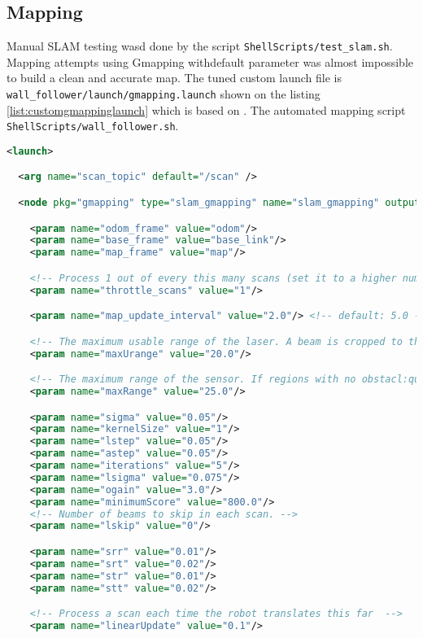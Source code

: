 \documentclass[10pt,journal,compsoc]{IEEEtran}
\begin{document}
\subsection{Mapping}
Manual SLAM testing wasd done by the script \verb!ShellScripts/test_slam.sh!.
Mapping attempts using Gmapping withdefault parameter was almost impossible to build a clean and accurate map. The tuned custom launch file is \verb!wall_follower/launch/gmapping.launch! shown on the listing \ref{list:customgmappinglaunch} which is based on .
The automated mapping script \verb!ShellScripts/wall_follower.sh!.
\begin{lstlisting}[language=xml, caption={Python script to download dataset },label={list:customgmappinglaunch}]
      <launch>

  <arg name="scan_topic" default="/scan" />

  <node pkg="gmapping" type="slam_gmapping" name="slam_gmapping" output="screen">

    <param name="odom_frame" value="odom"/>
    <param name="base_frame" value="base_link"/>
    <param name="map_frame" value="map"/>

    <!-- Process 1 out of every this many scans (set it to a higher number to skip more scans)  -->
    <param name="throttle_scans" value="1"/>

    <param name="map_update_interval" value="2.0"/> <!-- default: 5.0 -->

    <!-- The maximum usable range of the laser. A beam is cropped to this value.  -->
    <param name="maxUrange" value="20.0"/>

    <!-- The maximum range of the sensor. If regions with no obstacl:quj;es within the range of the sensor should appear as free space in the map, set maxUrange < maximum range of the real sensor <= maxRange -->
    <param name="maxRange" value="25.0"/>

    <param name="sigma" value="0.05"/>
    <param name="kernelSize" value="1"/>
    <param name="lstep" value="0.05"/>
    <param name="astep" value="0.05"/>
    <param name="iterations" value="5"/>
    <param name="lsigma" value="0.075"/>
    <param name="ogain" value="3.0"/>
    <param name="minimumScore" value="800.0"/>
    <!-- Number of beams to skip in each scan. -->
    <param name="lskip" value="0"/>

    <param name="srr" value="0.01"/>
    <param name="srt" value="0.02"/>
    <param name="str" value="0.01"/>
    <param name="stt" value="0.02"/>

    <!-- Process a scan each time the robot translates this far  -->
    <param name="linearUpdate" value="0.1"/>


\end{lstlisting}
\end{document}
